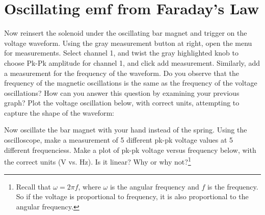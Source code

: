 \documentclass[12pt]{article}
\begin{document}
\section{Oscillating emf from Faraday's Law}

Now reinsert the solenoid under the oscillating bar magnet and trigger on the voltage waveform.  Using the gray measurement button at right, open the menu for measurements.  Select channel 1, and twist the gray highlighted knob to choose Pk-Pk amplitude for channel 1, and click add measurement.  Similarly, add a measurement for the frequency of the waveform.  Do you observe that the frequency of the magnetic oscillations is the same as the frequency of the voltage oscillations?  How can you answer this question by examining your previous graph?  Plot the voltage oscillation below, with correct units, attempting to capture the shape of the waveform: \\ \vspace{3cm}

Now oscillate the bar magnet with your hand instead of the spring.  Using the oscilloscope, make a measurement of 5 different pk-pk voltage values at 5 different frequenciess.  Make a plot of pk-pk voltage versus frequency below, with the correct units (V vs. Hz).  Is it linear?  Why or why not?\footnote{Recall that $\omega = 2\pi f$, where $\omega$ is the angular frequency and $f$ is the frequency.  So if the voltage is proportional to frequency, it is also proportional to the angular frequency.} \\ \vspace{3cm}
\end{document}
